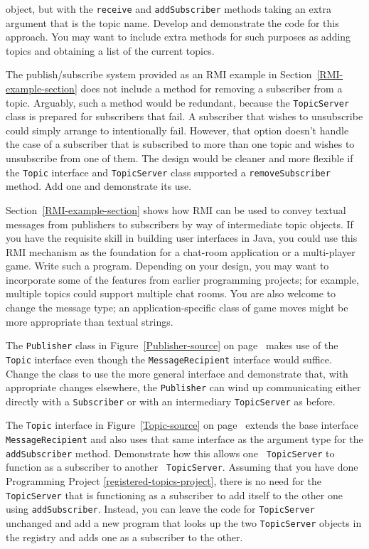 \begin{chapterEnumerate}
object, but with the {\tt receive} and {\tt addSubscriber} methods taking an extra argument
that is the topic name.  Develop and demonstrate the code for this
approach.  You may want to include extra methods for such purposes as
adding topics and obtaining a list of the current topics.
\item\label{unsubscribe-project}
The publish/subscribe system provided as an RMI example in
Section~\ref{RMI-example-section} does not
include a method for removing a subscriber from a topic.  Arguably, such a
method would be
redundant, because the
{\tt TopicServer} class is prepared for subscribers that
fail.  A subscriber that wishes to unsubscribe could simply arrange to
intentionally fail.  However, that option doesn't handle the case
of a subscriber that is subscribed to more than one topic and wishes to
unsubscribe from one of them.
The design would be cleaner and more
flexible if the {\tt Topic} interface and {\tt TopicServer} class
supported a {\tt removeSubscriber} method.  Add one and demonstrate its use.
\item\label{chat-room-game-project}
Section~\ref{RMI-example-section} shows how RMI can be used to convey
textual messages from publishers to subscribers by way of intermediate
topic objects.  If you have the requisite skill in building user
interfaces in Java, you could use this RMI mechanism as the foundation
for a chat-room application or a multi-player game.  Write such a
program.  Depending on your design, you may want to incorporate some of
the features from earlier programming projects; for example, multiple topics
could support multiple chat rooms.  You are also welcome to change the
message type; an application-specific class of game
moves might be more appropriate than textual strings.
\item\label{publish-to-MessageRecipient-project}
The {\tt Publisher} class in Figure~\ref{Publisher-source} on
page~\pageref{Publisher-source} makes use of the {\tt Topic} interface
even though the {\tt MessageRecipient} interface would suffice.
Change the class to use the more general interface and demonstrate
that, with appropriate changes elsewhere, the {\tt Publisher} can wind
up communicating either directly with a {\tt Subscriber} or with an
intermediary {\tt TopicServer} as before.
\item\label{topic-as-subscriber-project}
The {\tt Topic} interface in Figure~\ref{Topic-source} on
page~\pageref{Topic-source} extends the base interface {\tt MessageRecipient}
and also uses that same interface as the argument type for the {\tt
  addSubscriber} method.  Demonstrate how this allows one {\tt
  TopicServer} to function as a subscriber to another {\tt
  TopicServer}.  Assuming that you have done Programming Project \ref{registered-topics-project}, there is no need for the \texttt{TopicServer} that is functioning as a subscriber to add itself to the other one using \texttt{addSubscriber}.  Instead, you can leave the code for \texttt{TopicServer} unchanged and add a new program that looks up the two \texttt{TopicServer} objects in the registry and adds one as a subscriber to the other.
\end{chapterEnumerate}

